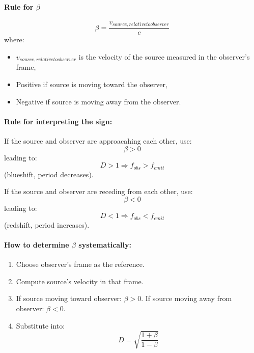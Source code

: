 \documentclass[a4paper]{article}
\theoremstyle{plain}
\theoremstyle{definition}
\begin{document}
\paragraph{Rule for $\beta$}

\begin{equation}
\beta = \frac{v_{source,relative to observer}}{c}
\end{equation}
where:
\begin{itemize}
\item $v_{source,relative to observer}$ is the velocity of the source measured in the observer's frame,
\item Positive if source is moving toward the observer,
\item Negative if source is moving away from the observer.
\end{itemize}

\paragraph{Rule for interpreting the sign:}

If the source and observer are approacahing each other, use:
\begin{equation}
\beta > 0
\end{equation}
leading to:
\begin{equation}
D > 1 \Rightarrow f_{obs} > f_{emit}
\end{equation}
(blueshift, period decreases).

If the source and observer are receding from each other, use:
\begin{equation}
\beta < 0
\end{equation}
leading to:
\begin{equation}
D < 1 \Rightarrow f_{obs} < f_{emit}
\end{equation}
(redshift, period increases).

\paragraph{How to determine $\beta$ systematically:}

\begin{enumerate}
\item Choose observer's frame as the reference.
\item Compute source's velocity in that frame.
\item If source moving toward observer: $\beta > 0$.  If source moving away from observer: $\beta < 0$.
\item Substitute into:
\begin{equation}
D = \sqrt{ \frac{1+\beta}{1-\beta} }
\end{equation}
\end{enumerate}
\end{document}
